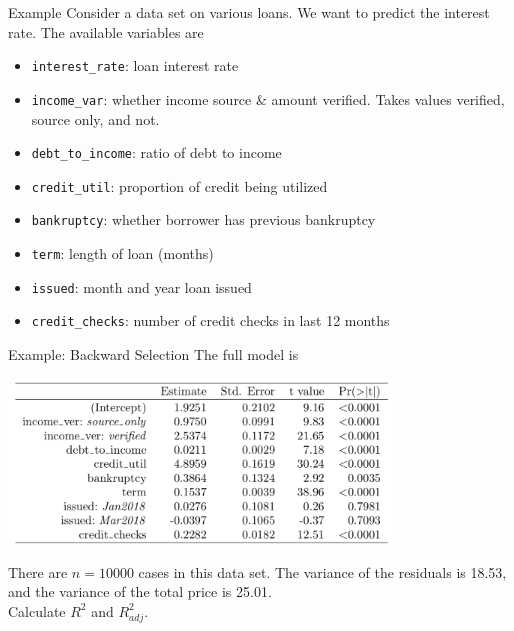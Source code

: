 \begin{frame}{Example}
    Consider a data set on various loans. We want to predict the interest rate. The available variables are
    \begin{itemize}
        \item \texttt{interest\_rate}: loan interest rate
        \item \texttt{income\_var}: whether income source \& amount verified. Takes values verified, source only, and not.
        \item \texttt{debt\_to\_income}: ratio of debt to income
        \item \texttt{credit\_util}: proportion of credit being utilized
        \item \texttt{bankruptcy}: whether borrower has previous bankruptcy
        \item \texttt{term}: length of loan (months)
        \item \texttt{issued}: month and year loan issued
        \item \texttt{credit\_checks}: number of credit checks in last 12 months
    \end{itemize}
\end{frame}

\begin{frame}{Example: Backward Selection}
    The full model is
    \begin{center}
        \includegraphics[width=4in]{images/fullmodel.png}
    \end{center}
    There are $n = 10000$ cases in this data set. The variance of the residuals is 18.53, and the variance of the total price is 25.01. \\ Calculate $R^2$ and $R^2_{adj}$.
\end{frame}

